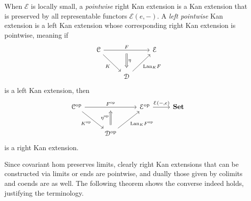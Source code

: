 \begin{definition}\label{dfn:10.6}
	When $\mathcal{E} $ is locally small, a \emph{pointwise} right Kan extension is a Kan extension that is preserved by all representable functors $\mathcal{E} (e,-)$. A \emph{left pointwise} Kan extension is a left Kan extension whose corresponding right Kan extension is pointwise, meaning if
	\[\begin{tikzcd}[row sep = 2.5em, column sep = 2.5em]
		\mathcal{C} \ar[" F "{name=F}, rr] \ar[" K "', dr]  &  & \mathcal{E}  \\
	 & \mathcal{D} \ar[" \mathrm{Lan} _KF "', ur]  & 
	 \arrow[from=F, to=2-2, Rightarrow, " \eta ", shorten=5pt] 
	\end{tikzcd}\]
	is a left Kan extension, then
	\[\begin{tikzcd}[row sep = 2.5em, column sep = 2.5em]
		\mathcal{C} ^{\mathrm{op}} \ar[" F^{\mathrm{op}}  "{name=F}, rr] \ar[" K^{\mathrm{op}}  "', dr]  &  & \mathcal{E} ^{\mathrm{op}} \ar[" \mathcal{E} (-\text{,} e) ", r]  & \Set  \\
	 & \mathcal{D} ^{\mathrm{op}} \ar[" \mathrm{Lan} _KF^{\mathrm{op}}  "', ur]  &  & 
	 \arrow[to=F, from=2-2, Rightarrow, " \eta^{\mathrm{op}}  ", shorten=5pt] 
	\end{tikzcd}\]
	is a right Kan extension.
\end{definition}

Since covariant hom preserves limits, clearly right Kan extensions that can be constructed via limits or ends are pointwise, and dually those given by colimits and coends are as well. The following theorem shows the converse indeed holds, justifying the terminology.

